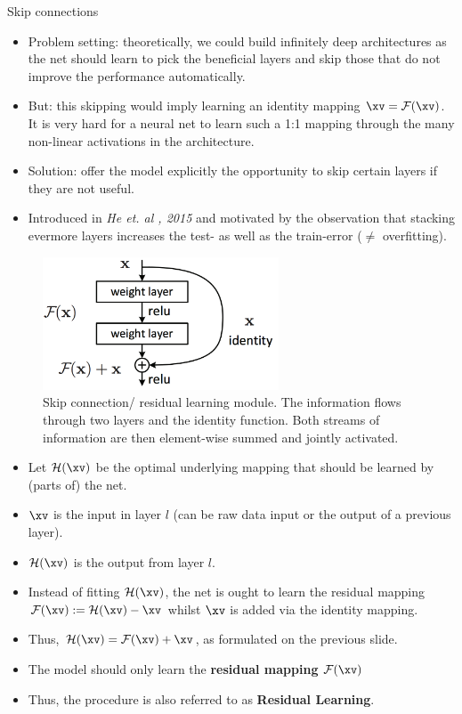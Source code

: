 \begin{vbframe}{Skip connections}
    \begin{itemize}
        \item Problem setting: theoretically, we could build infinitely deep architectures as the net should learn to pick the beneficial layers and skip those that do not improve the performance automatically.
        \item But: this skipping would imply learning an identity mapping $\xv = \mathcal{F}(\xv)$. It is very hard for a neural net to learn such a 1:1 mapping through the many non-linear activations in the architecture.
        \item Solution: offer the model explicitly the opportunity to skip certain layers if they are not useful.
        \item Introduced in \textit{He et. al , 2015} and motivated by the observation that stacking evermore layers increases the test- as well as the train-error ($\neq$ overfitting).
    \end{itemize}
\framebreak

  \begin{figure}
    \centering
    \includegraphics[width=7cm]{plots/05_conv_variations/skip/residual_module.png}
    \caption{Skip connection/ residual learning module. The information flows through two layers and the identity function. Both streams of information are then element-wise summed and jointly activated.}
  \end{figure}
\framebreak

    \begin{itemize}
        \item Let $\mathcal{H}(\xv)$ be the optimal underlying mapping that should be learned by (parts of) the net.
        \item $\xv$ is the input in layer $l$ (can be raw data input or the output of a previous layer).
        \item $\mathcal{H}(\xv)$ is the output from layer $l$.
        \item Instead of fitting $\mathcal{H}(\xv)$, the net is ought to learn the residual mapping $\mathcal{F}(\xv):=\mathcal{H}(\xv)-\xv$ whilst $\xv$ is added via the identity mapping.
        \item Thus, $\mathcal{H}(\xv) = \mathcal{F}(\xv) + \xv$, as formulated on the previous slide.
        \item The model should only learn the \textbf{residual mapping} $\mathcal{F}(\xv)$ 
        \item Thus, the procedure is also referred to as \textbf{Residual Learning}.
    \end{itemize}
\framebreak


\end{vbframe}
